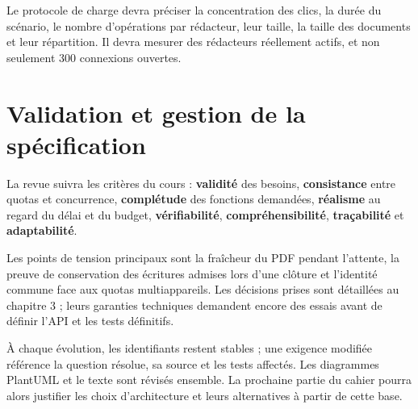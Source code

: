 Le protocole de charge devra préciser la concentration des clics, la durée du scénario, le nombre d'opérations par rédacteur, leur taille, la taille des documents et leur répartition. Il devra mesurer des rédacteurs réellement actifs, et non seulement 300 connexions ouvertes.

\section{Validation et gestion de la spécification}
La revue suivra les critères du cours \cite[diapositives 37--39]{cours} : \textbf{validité} des besoins, \textbf{consistance} entre quotas et concurrence, \textbf{complétude} des fonctions demandées, \textbf{réalisme} au regard du délai et du budget, \textbf{vérifiabilité}, \textbf{compréhensibilité}, \textbf{traçabilité} et \textbf{adaptabilité}.

Les points de tension principaux sont la fraîcheur du PDF pendant l'attente, la preuve de conservation des écritures admises lors d'une clôture et l'identité commune face aux quotas multiappareils. Les décisions prises sont détaillées au chapitre 3 ; leurs garanties techniques demandent encore des essais avant de définir l'API et les tests définitifs.

À chaque évolution, les identifiants restent stables ; une exigence modifiée référence la question résolue, sa source et les tests affectés. Les diagrammes PlantUML et le texte sont révisés ensemble. La prochaine partie du cahier pourra alors justifier les choix d'architecture et leurs alternatives à partir de cette base.
